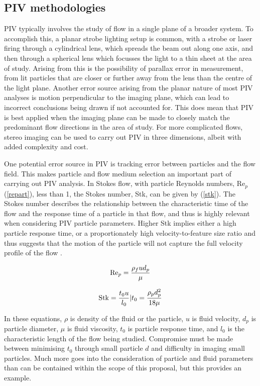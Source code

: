 \documentclass[12pt, a4paper]{amsart}
\begin{document}
\subsection{PIV methodologies}
PIV typically involves the study of flow in a single plane of a broader system. To accomplish this, a planar strobe lighting setup is common, with a strobe or laser firing through a cylindrical lens, which spreads the beam out along one axis, and then through a spherical lens which focusses the light to a thin sheet at the area of study. Arising from this is the possibility of parallax error in measurement, from lit particles that are closer or further away from the lens than the centre of the light plane. Another error source arising from the planar nature of most PIV analyses is motion perpendicular to the imaging plane, which can lead to incorrect conclusions being drawn if not accounted for. This does mean that PIV is best applied when the imaging plane can be made to closely match the predominant flow directions in the area of study. For more complicated flows, stereo imaging can be used to carry out PIV in three dimensions, albeit with added complexity and cost. 

One potential error source in PIV is tracking error between particles and the flow field. This makes particle and flow medium selection an important part of carrying out PIV analysis. In Stokes flow, with particle Reynolds numbers, Re$_p$ (\ref{repart}), less than 1, the Stokes number, Stk, can be given by (\ref{stk}). The Stokes number describes the relationship between the characteristic time of the flow and the response time of a particle in that flow, and thus is highly relevant when considering PIV particle parameters. Higher Stk implies either a high particle response time, or a proportionately high velocity-to-feature size ratio and thus suggests that the motion of the particle will not capture the full velocity profile of the flow \citep{wikistokes}.


\begin{equation}\label{repart} \textnormal{Re}_p = \frac{\rho_f u d_p}{\mu} \end{equation} 

	\begin{equation}\label{stk} \textnormal{Stk} = \frac{t_0 u}{l_0} | t_0 = \frac{\rho_p d_p^2}{18\mu}\end{equation}

In these equations, $\rho$ is density of the fluid or the particle, $u$ is fluid velocity, $d_p$ is particle diameter, $\mu$ is fluid viscosity, $t_0$ is particle response time, and $l_0$ is the characteristic length of the flow being studied. Compromise must be made between minimising $t_0$ through small particle $d$ and difficulty in imaging small particles. Much more goes into the consideration of particle and fluid parameters than can be contained within the scope of this proposal, but this provides an example.  
\end{document}
